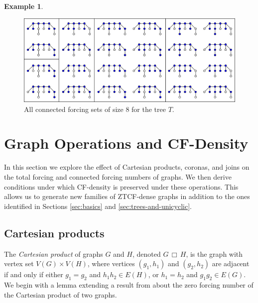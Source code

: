 \documentclass[11pt]{article}
\theoremstyle{definition}
\newtheorem{example}{Example}
\newcommand{\cprod}{\,\Box\,}
\newcommand{\1}{\vspace{0.1cm}}
\newcommand{\2}{\vspace{0.2cm}}
\newcommand{\3}{\vspace{0.3cm}}
\begin{document}
\begin{example}
{
}

\begin{figure}[htb]
\centering
\includegraphics[width=1\textwidth]{fig_cf_example_tree3.pdf}



\caption{All connected forcing sets of size 8 for the tree $T$.}
\label{fig:cf_example_tree2}
\end{figure}
\end{example}


\section{Graph Operations and CF-Density}
\label{sec:cartesian-alt}
In this section we explore the effect of Cartesian products, coronas, and joins on the total forcing and connected forcing numbers of graphs. We then derive conditions under which CF-density is preserved under these operations. This allows us to generate new families of ZTCF-dense graphs in addition to the ones identified in Sections \ref{sec:basics} and \ref{sec:trees-and-unicyclic}. 
\subsection{Cartesian products}

The \emph{Cartesian product} of graphs $G$ and $H$, denoted $G \cprod H$, is the graph with vertex set $V(G)\times V(H)$, where vertices $(g_1,h_1)$ and $(g_2,h_2) $ are adjacent if and only if either $ g_1 = g_2 $ and $ h_1h_2 \in E(H) $, or $ h_1 = h_2 $ and $ g_1g_2 \in E(G) $. We begin with a lemma extending a result from \cite{AIM-Workshop} about the zero forcing number of the Cartesian product of two graphs.
\end{document}
